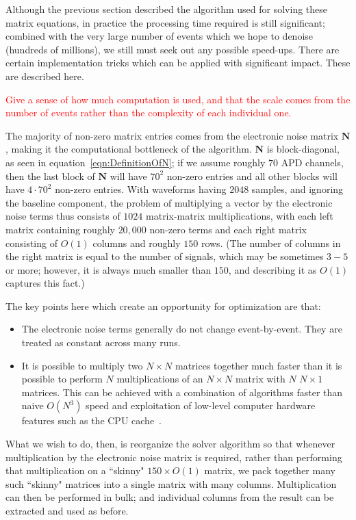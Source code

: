 Although the previous section described the algorithm used for solving these matrix equations, in practice the processing time required is still significant; combined with the very large number of events which we hope to denoise (hundreds of millions), we still must seek out any possible speed-ups.  There are certain implementation tricks which can be applied with significant impact.  These are described here.

\textcolor{red}{Give a sense of how much computation is used, and that the scale comes from the number of events rather than the complexity of each individual one.}

The majority of non-zero matrix entries comes from the electronic noise matrix $\mathbf{N}$, making it the computational bottleneck of the algorithm.  $\mathbf{N}$ is block-diagonal, as seen in equation~\ref{eqn:DefinitionOfN}; if we assume roughly $70$ APD channels, then the last block of $\mathbf{N}$ will have $70^2$ non-zero entries and all other blocks will have $4\cdot 70^2$ non-zero entries.  With waveforms having $2048$ samples, and ignoring the baseline component, the problem of multiplying a vector by the electronic noise terms thus consists of $1024$ matrix-matrix multiplications, with each left matrix containing roughly $20,000$ non-zero terms and each right matrix consisting of $O(1)$ columns and roughly $150$ rows.  (The number of columns in the right matrix is equal to the number of signals, which may be sometimes $3-5$ or more; however, it is always much smaller than $150$, and describing it as $O(1)$ captures this fact.)

The key points here which create an opportunity for optimization are that:
\begin{itemize}
\item The electronic noise terms generally do not change event-by-event.  They are treated as constant across many runs.
\item It is possible to multiply two $N \times N$ matrices together much faster than it is possible to perform $N$ multiplications of an $N \times N$ matrix with $N$ $N \times 1$ matrices.  This can be achieved with a combination of algorithms faster than naive $O(N^3)$ speed and exploitation of low-level computer hardware features such as the CPU cache~\cite{BLASFirstReference,AnatomyOfMatrixMultiply}.
\end{itemize}
What we wish to do, then, is reorganize the solver algorithm so that whenever multiplication by the electronic noise matrix is required, rather than performing that multiplication on a ``skinny" $150 \times O(1)$ matrix, we pack together many such ``skinny" matrices into a single matrix with many columns.  Multiplication can then be performed in bulk; and individual columns from the result can be extracted and used as before.

